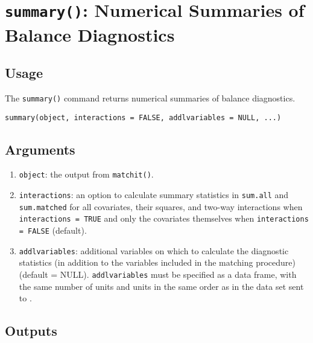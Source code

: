 \section{\texttt{summary()}: Numerical Summaries of Balance Diagnostics}

\subsection{Usage}

The \texttt{summary()} command returns numerical summaries of balance
diagnostics.
\begin{verbatim}
summary(object, interactions = FALSE, addlvariables = NULL, ...)
\end{verbatim}

\subsection{Arguments}

\begin{enumerate}
\item \texttt{object}: the output from {\tt matchit()}.
\item \texttt{interactions}: an option to calculate summary
  statistics in \texttt{sum.all} and \texttt{sum.matched} for all
  covariates, their squares, and two-way interactions when
  \texttt{interactions = TRUE} and only the covariates themselves when
  \texttt{interactions = FALSE} (default).
\item \texttt{addlvariables}: additional variables
  on which to calculate the diagnostic statistics (in addition to the
  variables included in the matching procedure) (default = NULL).  
  \texttt{addlvariables} must be
  specified as a data frame, with the same number of units and units
  in the same order as in the data set sent to \MatchIt .
\end{enumerate}

\subsection{Outputs}

